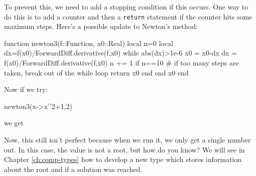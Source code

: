 To prevent this, we need to add a stopping condition if this occurs.  One way to do this is to add a  counter and then a \texttt{return} statement if the counter hits some maximum steps. Here's a possible update to Newton's method: 

\begin{jlblock}[root]
function newton3(f::Function,  x0::Real)
  local n=0
  local dx=f(x0)/ForwardDiff.derivative(f,x0)
  while abs(dx)>1e-6
    x0 = x0-dx
    dx = f(x0)/ForwardDiff.derivative(f,x0)
    n += 1 
    if n==10  # if too many steps are taken, break out of the while loop
      return x0
    end
  end
  x0
end
\end{jlblock}

Now if we try:
\begin{jlblock}[root]
newton3(x->x^2+1,2)
\end{jlblock}
we get  \printpythontex[verbatim]

Now, this still isn't perfect because when we run it, we only get a single number out.  In this case, the value is not a root, but how do you know?  We will see in Chapter \ref{ch:comp-types} how to develop a new type which stores information about the root and if a solution was reached.  
